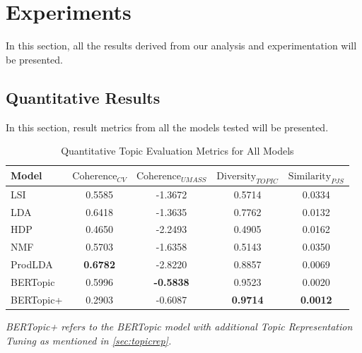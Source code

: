 \section{Experiments}
\label{sec:Experiments}
In this section, all the results derived from our analysis and experimentation will be presented.

\subsection{Quantitative Results}
\label{sec:QuantRes}
In this section, result metrics from all the models tested will be presented.
\begin{table}[H]
\centering
\caption{Quantitative Topic Evaluation Metrics for All Models}
\begin{tabular}{@{}p{1.5cm}cccc@{}}
\toprule
Model & $\text{Coherence}_{CV}$ & $\text{Coherence}_{UMASS}$ & $\text{Diversity}_{TOPIC}$ & $\text{Similarity}_{PJS}$ \\ \midrule
LSI & 0.5585 & -1.3672 & 0.5714 & 0.0334 \\
LDA & 0.6418 & -1.3635 & 0.7762 & 0.0132 \\
HDP & 0.4650 & -2.2493 & 0.4905 & 0.0162 \\
NMF & 0.5703 & -1.6358 & 0.5143 & 0.0350 \\
ProdLDA & \textbf{0.6782} & -2.8220 & 0.8857 & 0.0069 \\
BERTopic & 0.5996 & \textbf{-0.5838} & 0.9523 & 0.0020 \\
BERTopic+ & 0.2903 & -0.6087 & \textbf{0.9714} & \textbf{0.0012} \\ 
\bottomrule
\end{tabular}
\begin{tablenotes}
  \small
  \item \textit{BERTopic+ refers to the BERTopic model with additional Topic Representation Tuning as mentioned in \ref{sec:topicrep}.}
\end{tablenotes}
\label{tab:quant_metrics}
\end{table}

